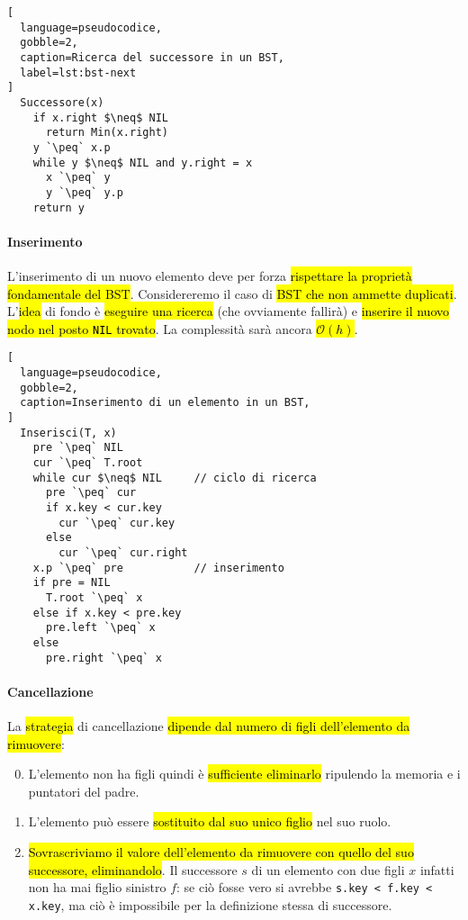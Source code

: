 \documentclass[a4paper,11pt,twoside]{article}
\theoremstyle{plain}
\theoremstyle{definition}
\theoremstyle{remark}
\newcommand{\peq}{$\gets$}
\begin{document}
\begin{lstlisting}[
  language=pseudocodice,
  gobble=2,
  caption=Ricerca del successore in un BST,
  label=lst:bst-next
]
  Successore(x)
    if x.right $\neq$ NIL
      return Min(x.right)
    y `\peq` x.p
    while y $\neq$ NIL and y.right = x
      x `\peq` y
      y `\peq` y.p
    return y
\end{lstlisting}

\paragraph{Inserimento} L'inserimento di un nuovo elemento deve per forza
\hl{rispettare la proprietà fondamentale del BST}. Considereremo il caso di
\hl{BST che non ammette duplicati}. L'\hl{idea} di fondo è \hl{eseguire una
ricerca} (che ovviamente fallirà) e \hl{inserire il nuovo nodo nel posto
\texttt{NIL} trovato}. La complessità sarà ancora \hl{$\mathcal{O}(h)$}.

\begin{lstlisting}[
  language=pseudocodice,
  gobble=2,
  caption=Inserimento di un elemento in un BST,
]
  Inserisci(T, x)
    pre `\peq` NIL
    cur `\peq` T.root
    while cur $\neq$ NIL     // ciclo di ricerca
      pre `\peq` cur
      if x.key < cur.key
        cur `\peq` cur.key
      else
        cur `\peq` cur.right
    x.p `\peq` pre           // inserimento
    if pre = NIL
      T.root `\peq` x
    else if x.key < pre.key
      pre.left `\peq` x
    else
      pre.right `\peq` x
\end{lstlisting}

\paragraph{Cancellazione} La \hl{strategia} di cancellazione \hl{dipende dal
numero di figli dell'elemento da rimuovere}:

\begin{enumerate}
  \setcounter{enumi}{-1}
  \item L'elemento non ha figli quindi è \hl{sufficiente eliminarlo} ripulendo la
    memoria e i puntatori del padre.
  \item L'elemento può essere \hl{sostituito dal suo unico figlio} nel suo
    ruolo.
  \item \hl{Sovrascriviamo il valore dell'elemento da rimuovere con quello del
    suo successore, eliminandolo}. Il successore $s$ di un elemento con due
    figli $x$ infatti non ha mai figlio sinistro $f$: se ciò fosse vero si
    avrebbe \texttt{s.key < f.key < x.key}, ma ciò è impossibile per la
    definizione stessa di successore.
\end{enumerate}
\end{document}
